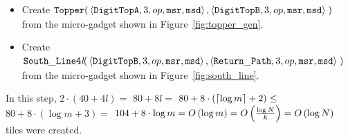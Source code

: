\begin{itemize}
\begin{itemize}
            \item Create
            $\begin{aligned}[t]
                {\tt Topper}(& \left\langle {\tt DigitTopA}, 3, \inc, {\tt msr}, {\tt msd}\right\rangle,
                               \left\langle {\tt DigitTopB}, 3, \inc, {\tt msr}, {\tt msd}\right\rangle \;)
            \end{aligned}$\\ from the micro-gadget shown in Figure~\ref{fig:topper_gen}.


            \item Create
            $\begin{aligned}[t]
                {\tt South\_Line4\textit{l}}(& \left\langle {\tt DigitTopB}, 3, \inc, {\tt msr}, {\tt msd}\right\rangle,
                                               \left\langle \returnpath,     3, \inc, {\tt msr}, {\tt msd}\right\rangle \;)
            \end{aligned}$\\ from the micro-gadget shown in Figure~\ref{fig:south_line}.
        \end{itemize}
        In this step, $2 \cdot \left( 40 + 4l \right) =$
        $80 + 8l =$
        $80 + 8 \cdot \left( \ceil*{\log m} + 2 \right) \leq$
        $80 + 8 \cdot \left( {\log m} + 3 \right) =$
        $104 + 8 \cdot {\log m} = \bigologm$ tiles were created.
    \end{itemize}

